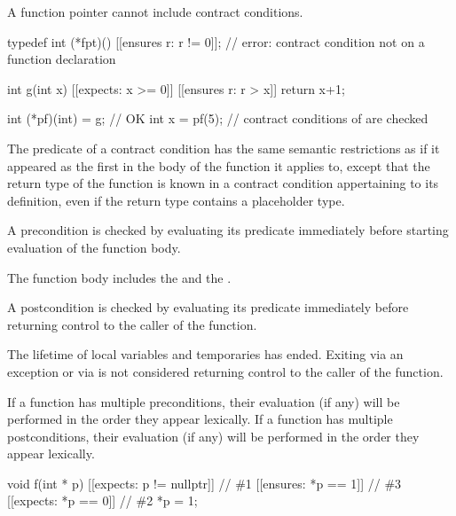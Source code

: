 \pnum
\begin{note}
A function pointer cannot include contract conditions.
\begin{example}
\begin{codeblock}
typedef int (*fpt)() [[ensures r: r != 0]];     // error: contract condition not on a function declaration

int g(int x)
  [[expects: x >= 0]]
  [[ensures r: r > x]]
{
  return x+1;
}

int (*pf)(int) = g;                             // OK
int x = pf(5);                                  // contract conditions of  are checked
\end{codeblock}
\end{example}
\end{note}

\pnum
The predicate of a contract condition has the same semantic restrictions
as if it appeared as the first 
in the body of the function it applies to,
except that the return type of the function is
known in a contract condition appertaining to its definition,
even if the return type contains a placeholder type.

\pnum
A precondition is checked by evaluating its predicate
immediately before starting evaluation of the function body.
\begin{note}
The function body includes
the  and
the .
\end{note}
A postcondition is checked by evaluating its predicate
immediately before returning control to the caller of the function.
\begin{note}
The lifetime of local variables and temporaries has ended.
Exiting via an exception or via 
is not considered returning control to the caller of the function.
\end{note}

\pnum
If a function has multiple preconditions,
their evaluation (if any) will be performed
in the order they appear lexically.
If a function has multiple postconditions,
their evaluation (if any) will be performed
in the order they appear lexically.
\begin{example}
\begin{codeblock}
void f(int * p)
  [[expects: p != nullptr]]                     // \#1
  [[ensures: *p == 1]]                          // \#3
  [[expects: *p == 0]]                          // \#2
{
  *p = 1;
}
\end{codeblock}
\end{example}

